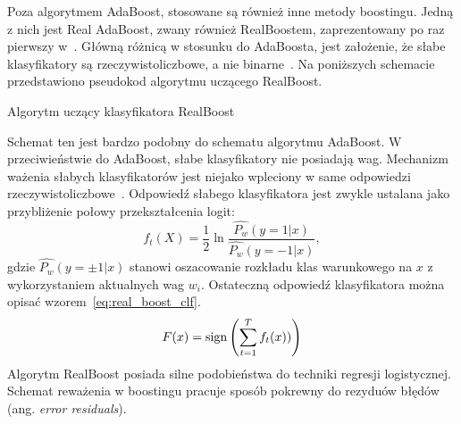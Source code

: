 Poza algorytmem AdaBoost, stosowane są również inne metody boostingu.
Jedną z nich jest Real AdaBoost, zwany również RealBoostem, zaprezentowany po raz pierwszy w~\cite{10.1023/A:1007614523901}.
Główną różnicą w stosunku do AdaBoosta, jest założenie, że słabe klasyfikatory są rzeczywistoliczbowe, a nie binarne~\cite{szybka_detekcja_klesk}.
Na poniższych schemacie przedstawiono pseudokod algorytmu uczącego RealBoost.
\begin{algorithm}
    \caption{Algorytm uczący klasyfikatora RealBoost}
\end{algorithm}
\FloatBarrier
Schemat ten jest bardzo podobny do schematu algorytmu AdaBoost.
W przeciwieństwie do AdaBoost, słabe klasyfikatory nie posiadają wag.
Mechanizm ważenia słabych klasyfikatorów jest niejako wpleciony w same odpowiedzi rzeczywistoliczbowe~\cite{szybka_detekcja_klesk}.
Odpowiedź słabego klasyfikatora jest zwykle ustalana jako przybliżenie połowy przekształcenia logit:
\begin{equation}
    \label{eq:real_boost}
    f_t(X) =\dfrac{1}{2}\ln\dfrac{\hat{P_w}(y=1|x)}{\hat{P_w}(y=-1|x)},
\end{equation}
gdzie $\hat{P_w}(y=\pm1|x)$ stanowi oszacowanie rozkładu klas warunkowego na $x$ z wykorzystaniem aktualnych wag $w_i$.
Ostateczną odpowiedź klasyfikatora można opisać wzorem~\eqref{eq:real_boost_clf}.
\begin{equation}
    \label{eq:real_boost_clf}
    F(x) = \operatorname{sign}\left(\sum_{t=1}^{T} f_t(x))\right)
\end{equation}
Algorytm RealBoost posiada silne podobieństwa do techniki regresji logistycznej.
Schemat reważenia w boostingu pracuje sposób pokrewny do rezyduów błędów (ang. \textit{error residuals}).

